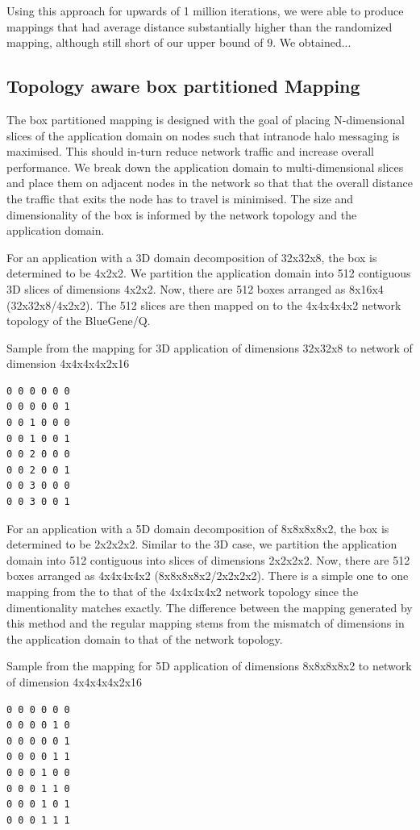 \documentclass{acm_proc_article-sp}
\begin{document}
Using this approach for upwards of 1 million iterations,
we were able to produce mappings that had average distance substantially
higher than the randomized mapping, although still short of our upper
bound of $9$.  We obtained...  

\subsection{Topology aware box partitioned Mapping}

The box partitioned mapping is designed with the goal of placing N-dimensional slices of the application domain on nodes such that
intranode halo messaging is maximised. This should in-turn reduce network traffic and increase overall performance.
We break down the application domain to multi-dimensional slices and place them on adjacent nodes in the network so that that the
overall distance the traffic that exits the node has to travel is minimised. The size and dimensionality of the box is informed
by the network topology and the application domain.

For an application with a 3D domain decomposition of 32x32x8, the box is determined to be 4x2x2. We partition the application domain
into 512 contiguous 3D slices of dimensions 4x2x2. Now, there are 512 boxes arranged as 8x16x4 (32x32x8/4x2x2).
The 512 slices are then mapped on to the 4x4x4x4x2 network topology of the BlueGene/Q.

Sample from the mapping for 3D application of dimensions 32x32x8 to network of dimension 4x4x4x4x2x16
\begin{lstlisting}
0 0 0 0 0 0
0 0 0 0 0 1
0 0 1 0 0 0
0 0 1 0 0 1
0 0 2 0 0 0
0 0 2 0 0 1
0 0 3 0 0 0
0 0 3 0 0 1
\end{lstlisting}

For an application with a 5D domain decomposition of 8x8x8x8x2, the box is determined to be 2x2x2x2. Similar to the 3D case, we
partition the application domain into 512 contiguous into  slices of dimensions 2x2x2x2.
Now, there are 512 boxes arranged as 4x4x4x4x2 (8x8x8x8x2/2x2x2x2). There is a simple one to one mapping from the
to that of the 4x4x4x4x2 network topology since the dimentionality matches exactly. The difference between the mapping
generated by this method and the regular mapping stems from the mismatch of dimensions in the application domain to that
of the network topology.

Sample from the mapping for 5D application of dimensions 8x8x8x8x2 to network of dimension 4x4x4x4x2x16
\begin{lstlisting}
0 0 0 0 0 0
0 0 0 0 1 0
0 0 0 0 0 1
0 0 0 0 1 1
0 0 0 1 0 0
0 0 0 1 1 0
0 0 0 1 0 1
0 0 0 1 1 1
\end{lstlisting}
\end{document}
